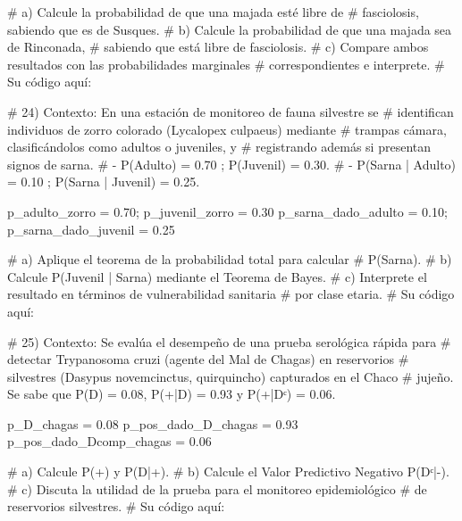 \documentclass[
  spanish,
  letterpaper,
  DIV=11,
  numbers=noendperiod]{scrreprt}
\newenvironment{Shaded}{\begin{snugshade}}{\end{snugshade}}
\newcommand{\CommentTok}[1]{\textcolor[rgb]{0.37,0.37,0.37}{#1}}
\newcommand{\FloatTok}[1]{\textcolor[rgb]{0.68,0.00,0.00}{#1}}
\newcommand{\NormalTok}[1]{\textcolor[rgb]{0.00,0.23,0.31}{#1}}
\newcommand{\OtherTok}[1]{\textcolor[rgb]{0.00,0.23,0.31}{#1}}
\begin{document}
\begin{Shaded}
\begin{Highlighting}[]
\CommentTok{\#     a) Calcule la probabilidad de que una majada esté libre de}
\CommentTok{\#        fasciolosis, sabiendo que es de Susques.}
\CommentTok{\#     b) Calcule la probabilidad de que una majada sea de Rinconada,}
\CommentTok{\#        sabiendo que está libre de fasciolosis.}
\CommentTok{\#     c) Compare ambos resultados con las probabilidades marginales}
\CommentTok{\#        correspondientes e interprete.}
\CommentTok{\# Su código aquí:}


\CommentTok{\# 24) Contexto: En una estación de monitoreo de fauna silvestre se}
\CommentTok{\#     identifican individuos de zorro colorado (Lycalopex culpaeus) mediante}
\CommentTok{\#     trampas cámara, clasificándolos como adultos o juveniles, y}
\CommentTok{\#     registrando además si presentan signos de sarna.}
\CommentTok{\#     {-} P(Adulto) = 0.70 ; P(Juvenil) = 0.30.}
\CommentTok{\#     {-} P(Sarna | Adulto) = 0.10 ; P(Sarna | Juvenil) = 0.25.}

\NormalTok{p\_adulto\_zorro }\OtherTok{=} \FloatTok{0.70}\NormalTok{; p\_juvenil\_zorro }\OtherTok{=} \FloatTok{0.30}
\NormalTok{p\_sarna\_dado\_adulto }\OtherTok{=} \FloatTok{0.10}\NormalTok{; p\_sarna\_dado\_juvenil }\OtherTok{=} \FloatTok{0.25}

\CommentTok{\#     a) Aplique el teorema de la probabilidad total para calcular}
\CommentTok{\#        P(Sarna).}
\CommentTok{\#     b) Calcule P(Juvenil | Sarna) mediante el Teorema de Bayes.}
\CommentTok{\#     c) Interprete el resultado en términos de vulnerabilidad sanitaria}
\CommentTok{\#        por clase etaria.}
\CommentTok{\# Su código aquí:}


\CommentTok{\# 25) Contexto: Se evalúa el desempeño de una prueba serológica rápida para}
\CommentTok{\#     detectar Trypanosoma cruzi (agente del Mal de Chagas) en reservorios}
\CommentTok{\#     silvestres (Dasypus novemcinctus, quirquincho) capturados en el Chaco}
\CommentTok{\#     jujeño. Se sabe que P(D) = 0.08, P(+|D) = 0.93 y P(+|Dᶜ) = 0.06.}

\NormalTok{p\_D\_chagas }\OtherTok{=} \FloatTok{0.08}
\NormalTok{p\_pos\_dado\_D\_chagas }\OtherTok{=} \FloatTok{0.93}
\NormalTok{p\_pos\_dado\_Dcomp\_chagas }\OtherTok{=} \FloatTok{0.06}

\CommentTok{\#     a) Calcule P(+) y P(D|+).}
\CommentTok{\#     b) Calcule el Valor Predictivo Negativo P(Dᶜ|{-}).}
\CommentTok{\#     c) Discuta la utilidad de la prueba para el monitoreo epidemiológico}
\CommentTok{\#        de reservorios silvestres.}
\CommentTok{\# Su código aquí:}



\end{Highlighting}
\end{Shaded}
\end{document}

